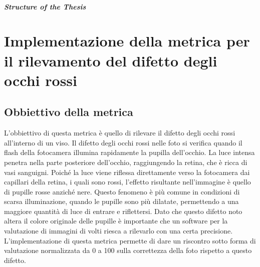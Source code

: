 \documentclass[12pt,a4paper,openright,twoside]{book}
\begin{document}
\paragraph{Structure of the Thesis}


\chapter{Implementazione della metrica per il rilevamento del difetto degli occhi rossi}
\label{chap:red-eye}

\section{Obbiettivo della metrica}
L'obbiettivo di questa metrica è quello di rilevare il difetto degli occhi rossi all'interno di un viso. 
Il difetto degli occhi rossi nelle foto si verifica quando il flash della fotocamera illumina rapidamente la pupilla dell'occhio. La luce intensa penetra nella parte posteriore dell'occhio, raggiungendo la retina, che è ricca di vasi sanguigni. Poiché la luce viene riflessa direttamente verso la fotocamera dai capillari della retina, i quali sono rossi, l'effetto risultante nell'immagine è quello di pupille rosse anziché nere. Questo fenomeno è più comune in condizioni di scarsa illuminazione, quando le pupille sono più dilatate, permettendo a una maggiore quantità di luce di entrare e riflettersi.
Dato che questo difetto noto altera il colore originale delle pupille è importante che un software per la valutazione di immagini di volti riesca a rilevarlo con una certa precisione.
L'implementazione di questa metrica permette di dare un riscontro sotto forma di valutazione normalizzata da 0 a 100 sulla correttezza della foto rispetto a questo difetto.
\end{document}
